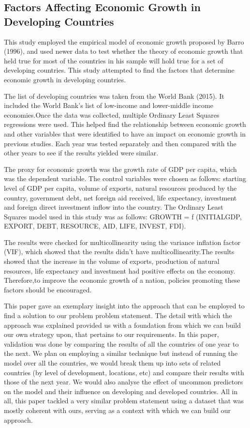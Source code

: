 \documentclass[conference]{IEEEtran}
\begin{document}
\subsection{Factors Affecting Economic Growth in Developing Countries}\label{econgrwth}
This study employed the empirical model of economic growth proposed by Barro (1996), and used newer data to test whether the theory of economic growth that held true for most of the countries in his sample will hold true for a set of developing countries. This study attempted to find the factors that determine economic growth in developing countries.

The list of developing countries was taken from the World Bank (2015). It included the World Bank's list of low-income and lower-middle income economies.Once the data was collected, multiple Ordinary Least Squares regressions were used. This helped find the relationship between economic growth and other variables that were identified to have an impact on economic growth in previous studies. Each year was tested separately and then compared with the other years to see if the results yielded were similar.

The proxy for economic growth was the growth rate of GDP per capita, which was the dependent variable. The control variables were chosen as follows: starting level of GDP per capita, volume of exports, natural resources produced by the country, government debt, net foreign aid received, life expectancy, investment and foreign direct investment inflow into the country. The Ordinary Least Squares model used in this study was as follows: GROWTH = f (INITIALGDP, EXPORT, DEBT, RESOURCE, AID, LIFE, INVEST, FDI). 

The results were checked for multicollinearity using the variance inflation factor (VIF), which showed that the results didn’t have multicollinearity.The results showed that the increase in the volume of exports, production of natural resources, life expectancy and investment had positive effects on the economy. Therefore,to improve the economic growth of a nation, policies promoting these factors should be encouraged.

This paper gave an exemplary insight into the approach that can be employed to find a solution to  our problem problem statement. The detail with which the approach was explained provided us with a foundation from which we can build our own strategy upon, that pertains to our requirements. In this paper, validation was done by comparing the results of all the countries of one year to the next. We plan on employing a similar technique but instead of running the model over all the countries, we would break them up into sets of related countries (by level of development, locations, etc) and compare their results with those of the next year. We would also analyse the effect of uncommon predictors on the model and their influence on developing and developed countries. All in all, this paper tackled a very similar problem statement using a dataset that was mostly coherent with ours, serving as a context with which we can build our approach. 
\end{document}
